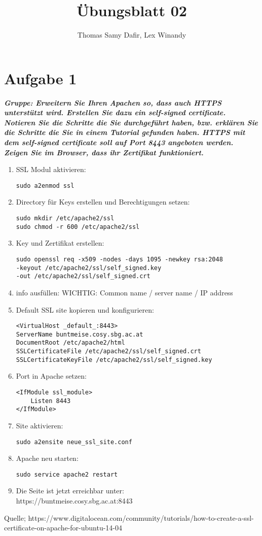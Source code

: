 \documentclass[12pt, a4paper]{report}
\title{Übungsblatt 02}
\author{Thomas Samy Dafir, Lex Winandy}
\date{}
\begin{document}
\maketitle

\section*{Aufgabe 1}
\textbf{\textit{Gruppe: Erweitern Sie Ihren Apachen so, dass auch HTTPS unterstützt wird. Erstellen
Sie dazu ein self-signed certificate. Notieren Sie die Schritte die Sie durchgeführt haben,
bzw. erklären Sie die Schritte die Sie in einem Tutorial gefunden haben. HTTPS mit dem self-signed certificate soll auf Port
8443 angeboten werden. Zeigen Sie im Browser, dass ihr Zertifikat funktioniert.}}\\
\begin{enumerate}
	\item SSL Modul aktivieren:
	\begin{verbatim}
sudo a2enmod ssl
	\end{verbatim}
	\item Directory für Keys erstellen und Berechtigungen setzen:
	\begin{verbatim}
sudo mkdir /etc/apache2/ssl
sudo chmod -r 600 /etc/apache2/ssl
	\end{verbatim}
	\item Key und Zertifikat erstellen:
	\begin{verbatim}
sudo openssl req -x509 -nodes -days 1095 -newkey rsa:2048
-keyout /etc/apache2/ssl/self_signed.key
-out /etc/apache2/ssl/self_signed.crt
	\end{verbatim}
	\item info ausfüllen: WICHTIG: Common name / server name / IP address
	\item Default SSL site kopieren und konfigurieren:
	\begin{verbatim}
<VirtualHost _default_:8443>
ServerName buntmeise.cosy.sbg.ac.at
DocumentRoot /etc/apache2/html
SSLCertificateFile /etc/apache2/ssl/self_signed.crt
SSLCertificateKeyFile /etc/apache2/ssl/self_signed.key
	\end{verbatim}
\item Port in Apache setzen:
	\begin{verbatim}
<IfModule ssl_module>
	Listen 8443
</IfModule>
	\end{verbatim}
\item Site aktivieren:
	\begin{verbatim}
sudo a2ensite neue_ssl_site.conf
	\end{verbatim}
	\item Apache neu starten:
	\begin{verbatim}
sudo service apache2 restart
	\end{verbatim}
\item Die Seite ist jetzt erreichbar unter:\\
https://buntmeise.cosy.sbg.ac.at:8443
\end{enumerate}
Quelle; https://www.digitalocean.com/community/tutorials/how-to-create-a-ssl-certificate-on-apache-for-ubuntu-14-04
\end{document}
